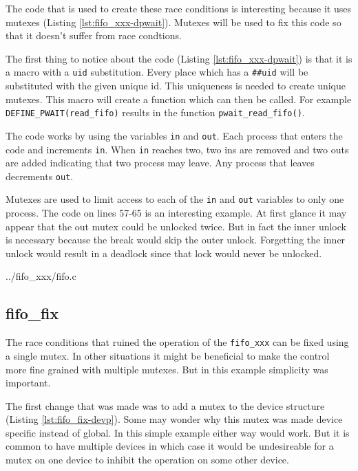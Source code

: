 \documentclass{article}
\begin{document}
The code that is used to create these race conditions is interesting
because it uses mutexes (Listing \ref{lst:fifo_xxx-dpwait}).
Mutexes will be used to fix this code so that it doesn't suffer
from race condtions.

The first thing to notice about the code (Listing \ref{lst:fifo_xxx-dpwait})
is that it is a macro with a \verb+uid+ substitution.
Every place which has a \verb+##uid+ will be substituted with the
given unique id.
This uniqueness is needed to create unique mutexes.
This macro will create a function which can then be called.
For example \verb+DEFINE_PWAIT(read_fifo)+ results in the function
\verb+pwait_read_fifo()+.

The code works by using the variables \verb+in+ and \verb+out+.
Each process that enters the code and increments \verb+in+.
When \verb+in+ reaches two, two ins are removed and two outs are added
indicating that two process may leave.
Any process that leaves decrements \verb+out+.

Mutexes are used to limit access to each of the \verb+in+ and
\verb+out+ variables to only one process.
The code on lines 57-65 is an interesting example.
At first glance it may appear that the out mutex could be unlocked
twice.
But in fact the inner unlock is necessary because the break would
skip the outer unlock.
Forgetting the inner unlock would result in a deadlock since that lock
would never be unlocked.


	{../fifo_xxx/fifo.c}


\subsection{fifo\_fix}

The race conditions that ruined the operation of the \verb+fifo_xxx+
can be fixed using a single mutex.
In other situations it might be beneficial to make the control more
fine grained with multiple mutexes.
But in this example simplicity was important.

The first change that was made was to add a mutex to the
device structure (Listing \ref{lst:fifo_fix-devp}).
Some may wonder why this mutex was made device specific instead of global.
In this simple example either way would work.
But it is common to have multiple devices in which case it would be
undesireable for a mutex on one device to inhibit the operation on
some other device.
\end{document}
